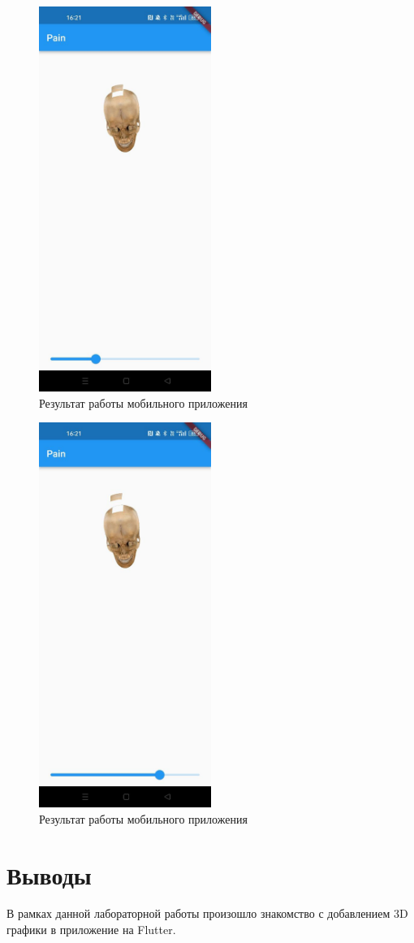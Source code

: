 \documentclass[a4paper, 14pt]{extarticle}
\begin{document}
\begin{figure}[H]
\centering
\includegraphics[width=0.5\textwidth]{images/res2.jpg}
\caption{Результат работы мобильного приложения}
\label{fig:img2}
\end{figure}

\begin{figure}[H]
\centering
\includegraphics[width=0.5\textwidth]{images/res3.jpg}
\caption{Результат работы мобильного приложения}
\label{fig:img3}
\end{figure}


\section{Выводы}
В рамках данной лабораторной работы произошло знакомство с добавлением 3D графики в приложение на Flutter.
\end{document}
